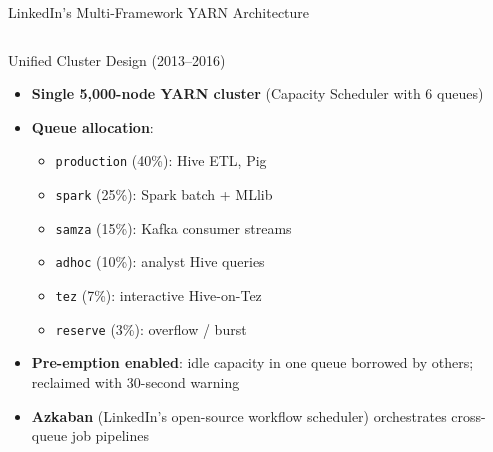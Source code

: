 \documentclass[aspectratio=169,10pt]{beamer}
\begin{document}
\begin{frame}{LinkedIn's Multi-Framework YARN Architecture}
  \begin{columns}[T]
      \begin{block}{Unified Cluster Design (2013--2016)}
        \begin{itemize}
          \item \textbf{Single 5{,}000-node YARN cluster}
                (Capacity Scheduler with 6 queues)
          \item \textbf{Queue allocation}:
                \begin{itemize}
                  \item \texttt{production} (40\%): Hive ETL, Pig
                  \item \texttt{spark} (25\%): Spark batch + MLlib
                  \item \texttt{samza} (15\%): Kafka consumer streams
                  \item \texttt{adhoc} (10\%): analyst Hive queries
                  \item \texttt{tez} (7\%): interactive Hive-on-Tez
                  \item \texttt{reserve} (3\%): overflow / burst
                \end{itemize}
          \item \textbf{Pre-emption enabled}: idle capacity in one
                queue borrowed by others; reclaimed with 30-second warning
          \item \textbf{Azkaban} (LinkedIn's open-source workflow
                scheduler) orchestrates cross-queue job pipelines
        \end{itemize}
      \end{block}

      \begin{center}
\end{center}
\end{columns}
\end{frame}
\end{document}

